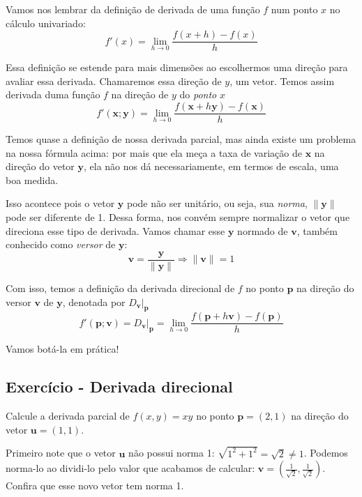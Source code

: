 \documentclass[
  portuguese,
  letterpaper,
  DIV=11,
  numbers=noendperiod]{scrreport}
\begin{document}
Vamos nos lembrar da definição de derivada de uma função \(f\) num ponto
\(x\) no cálculo univariado: \[
f'(x) = \lim_{h\rightarrow 0} \frac{f(x+h)-f(x)}{h}
\]

Essa definição se estende para mais dimensões ao escolhermos uma direção
para avaliar essa derivada. Chamaremos essa direção de \(y\), um vetor.
Temos assim derivada duma função \(f\) na direção de \(y\) do
\emph{ponto} \(x\) \[
f'(\pmb{x};\pmb{y}) = \lim_{h\rightarrow 0} \frac{f(\pmb{x}+h\pmb{y})-f(\pmb{x})}{h} 
\]

Temos quase a definição de nossa derivada parcial, mas ainda existe um
problema na nossa fórmula acima: por mais que ela meça a taxa de
variação de \(\pmb{x}\) na direção do vetor \(\pmb{y}\), ela não nos dá
necessariamente, em termos de escala, uma boa medida.

Isso acontece pois o vetor \(\pmb{y}\) pode não ser unitário, ou seja,
sua \emph{norma}, \(\lVert \pmb{y} \rVert\) pode ser diferente de 1.
Dessa forma, nos convém sempre normalizar o vetor que direciona esse
tipo de derivada. Vamos chamar esse \(\pmb{y}\) normado de \(\pmb{v}\),
também conhecido como \emph{versor} de \(\pmb{y}\): \[
\pmb{v} = \frac{\pmb{y}}{\lVert \pmb{y} \rVert} \Rightarrow \lVert \pmb{v} \rVert = 1
\]

Com isso, temos a definição da derivada direcional de \(f\) no ponto
\(\pmb{p}\) na direção do versor \(\pmb{v}\) de \(\pmb{y}\), denotada
por \(D_{\pmb{v}}\rvert_{\pmb{p}}\) \[
f'(\pmb{p};\pmb{v})= D_{\pmb{v}}\rvert_{\pmb{p}} = \lim_{h\rightarrow 0} \frac{f(\pmb{p}+h\pmb{v})-f(\pmb{p})}{h} 
\]

Vamos botá-la em prática!

\subsection{Exercício - Derivada
direcional}\label{exercuxedcio---derivada-direcional}

Calcule a derivada parcial de \(f(x,y) = xy\) no ponto
\(\pmb{p} = (2,1)\) na direção do vetor \(\pmb{u} = (1,1)\).

Primeiro note que o vetor \(\pmb{u}\) não possui norma 1:
\(\sqrt{1^2+1^2}=\sqrt{2}\neq 1\). Podemos norma-lo ao dividi-lo pelo
valor que acabamos de calcular:
\(\pmb{v} = \left(\frac{1}{\sqrt{2}}, \frac{1}{\sqrt{2}}\right)\).
Confira que esse novo vetor tem norma 1.
\end{document}
